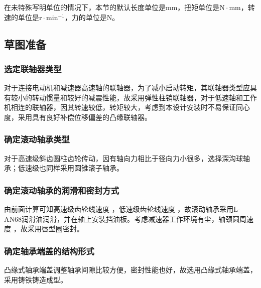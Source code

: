 在未特殊写明单位的情况下，本节的默认长度单位是mm，扭矩单位是$\mathrm{N}\cdot \mathrm{mm}$，转速的单位是$\mathrm{r}\cdot \mathrm{min^{-1}}$，力的单位是N。
\subsection{草图准备}
\subsubsection{选定联轴器类型}
对于连接电动机和减速器高速轴的联轴器，为了减小启动转矩，其联轴器类型应具有较小的转动惯量和较好的减震性能，故采用弹性柱销联轴器，对于低速轴和工作机相连的联轴器，因其转速较低，转矩较大，考虑到本设计安装时不易保证同心度，采用具有良好补偿位移偏差的凸缘联轴器。
\subsubsection{确定滚动轴承类型}
对于高速级斜齿圆柱齿轮传动，因有轴向力相比于径向力小很多，选择深沟球轴承；低速级也同样采用圆锥滚子轴承。
\subsubsection{确定滚动轴承的润滑和密封方式}
由前面计算可知高速级齿轮线速度 ，低速级齿轮线速度 ，故滚动轴承采用L-AN68润滑油润滑，并在轴上安装挡油板。考虑减速器工作环境有尘，轴颈圆周速度 ，故采用唇型圈密封。
\subsubsection{确定轴承端盖的结构形式}
凸缘式轴承端盖调整轴承间隙比较方便，密封性能也好，故选用凸缘式轴承端盖，采用铸铁铸造成型。
